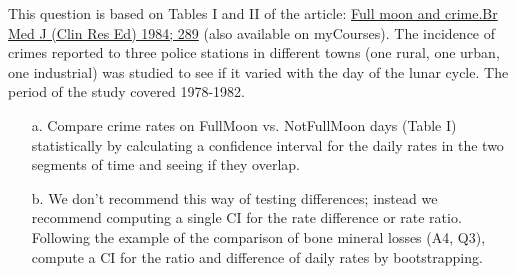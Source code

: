 \documentclass[letterpaper,9pt,twoside,printwatermark=false]{pinp}
\begin{document}
This question is based on Tables I and II of the article:
\href{https://doi.org/10.1136/bmj.289.6460.1789}{Full moon and crime.Br
Med J (Clin Res Ed) 1984; 289} (also available on myCourses). The
incidence of crimes reported to three police stations in different towns
(one rural, one urban, one industrial) was studied to see if it varied
with the day of the lunar cycle. The period of the study covered
1978-1982.

\begin{enumerate}

\item[a.] Compare crime rates on FullMoon vs. NotFullMoon days (Table I) statistically by calculating a confidence interval for the daily rates in the two segments of time and seeing if they overlap. 

\item[b.] We don't recommend this way of testing differences; instead we recommend computing a single
CI for the rate difference or rate ratio. Following the example of the comparison of bone mineral losses (A4, Q3), compute a CI for the ratio and difference of daily rates by bootstrapping.


\end{enumerate}





\end{document}
